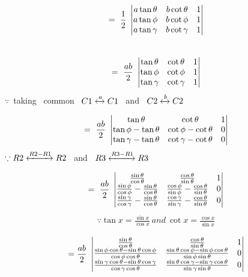 \documentclass[journal,12pt,twocolumn]{IEEEtran}
\begin{document}
\begin{multline}
=~\frac{1}{2}~\begin{vmatrix}
 a\tan\theta & b\cot\theta & 1  \\ 
 a\tan\phi & b\cot\phi & 1  \\
 a\tan\gamma & b\cot\gamma & 1 
\end{vmatrix}\end{multline}\\
\begin{multline}
=~\frac{ab}{2}~\begin{vmatrix}
 \tan\theta & \cot\theta & 1  \\ 
 \tan\phi &   \cot\phi & 1  \\
 \tan\gamma & \cot\gamma & 1 
\end{vmatrix}
\end{multline}
$\because$~taking~ common ~$ C1 \xleftrightarrow{{a}} C1$  ~and~ $C2 \xleftrightarrow{{b}} C2$

\begin{multline}
=~\frac{ab}{2}~\begin{vmatrix}
 \tan\theta & \cot\theta & 1  \\ 
 \tan\phi-\tan\theta & \cot\phi-\cot\theta & 0  \\
 \tan\gamma-\tan\theta & \cot\gamma-\cot\theta & 0 
\end{vmatrix}\end{multline}
$\because R2 \xleftrightarrow{{R2-R1}} R2$  ~and~ $R3 \xleftrightarrow{{R3-R1}} R3$


\begin{multline}
=~\frac{ab}{2}~\begin{vmatrix}
 \frac{\sin\theta}{\cos\theta} & \frac{\cos\theta}{\sin\theta} & 1  \\ 
 \frac{\sin\phi}{\cos\phi}-\frac{\sin\theta}{\cos\theta} & \frac{\cos\phi}{\sin\phi}-\frac{\cos\theta}{\sin\theta} & 0  \\
 \frac{\sin\gamma}{\cos\gamma}-\frac{\sin\theta}{\cos\theta} & \frac{\cos\gamma}{\sin\gamma}-\frac{\cos\theta}{\sin\theta} & 0 
\end{vmatrix}\end{multline}
\begin{align*}
\because \tan x = \frac{\sin x}{\cos x}~and~\cot x = \frac{\cos x}{\sin x} \end{align*}

\begin{multline}
=\frac{ab}{2}~\begin{vmatrix}
 \frac{\sin\theta}{\cos\theta} & \frac{\cos\theta}{\sin\theta} & 1  \\ 
 \frac{\sin\phi\cos\theta - \sin\theta\cos\phi}{\cos\phi\cos\theta} & \frac{\sin\theta\cos\phi - \sin\phi\cos\theta}{\sin\phi\sin\theta} & 0  \\
  \frac{\sin\gamma\cos\theta - \sin\theta\cos\gamma}{\cos\gamma\cos\theta} & \frac{\sin\theta\cos\gamma - \sin\gamma\cos\theta}{\sin\gamma\sin\theta} & 0
\end{vmatrix}   
\end{multline}
\end{document}
